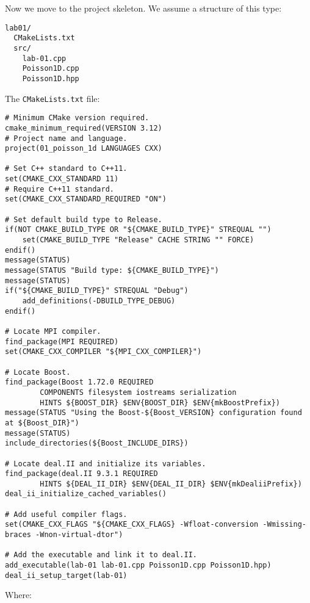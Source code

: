 \noindent
Now we move to the project skeleton. We assume a structure of this type:
\begin{lstlisting}
lab01/
  CMakeLists.txt
  src/
    lab-01.cpp
    Poisson1D.cpp
    Poisson1D.hpp\end{lstlisting}
The \texttt{CMakeLists.txt} file:
\begin{lstlisting}[mathescape=false]
# Minimum CMake version required.
cmake_minimum_required(VERSION 3.12)
# Project name and language.
project(01_poisson_1d LANGUAGES CXX)

# Set C++ standard to C++11.
set(CMAKE_CXX_STANDARD 11)
# Require C++11 standard.
set(CMAKE_CXX_STANDARD_REQUIRED "ON")

# Set default build type to Release.
if(NOT CMAKE_BUILD_TYPE OR "${CMAKE_BUILD_TYPE}" STREQUAL "")
    set(CMAKE_BUILD_TYPE "Release" CACHE STRING "" FORCE)
endif()
message(STATUS)
message(STATUS "Build type: ${CMAKE_BUILD_TYPE}")
message(STATUS)
if("${CMAKE_BUILD_TYPE}" STREQUAL "Debug")
    add_definitions(-DBUILD_TYPE_DEBUG)
endif()

# Locate MPI compiler.
find_package(MPI REQUIRED)
set(CMAKE_CXX_COMPILER "${MPI_CXX_COMPILER}")

# Locate Boost.
find_package(Boost 1.72.0 REQUIRED
        COMPONENTS filesystem iostreams serialization
        HINTS ${BOOST_DIR} $ENV{BOOST_DIR} $ENV{mkBoostPrefix})
message(STATUS "Using the Boost-${Boost_VERSION} configuration found at ${Boost_DIR}")
message(STATUS)
include_directories(${Boost_INCLUDE_DIRS})

# Locate deal.II and initialize its variables.
find_package(deal.II 9.3.1 REQUIRED
        HINTS ${DEAL_II_DIR} $ENV{DEAL_II_DIR} $ENV{mkDealiiPrefix})
deal_ii_initialize_cached_variables()

# Add useful compiler flags.
set(CMAKE_CXX_FLAGS "${CMAKE_CXX_FLAGS} -Wfloat-conversion -Wmissing-braces -Wnon-virtual-dtor")

# Add the executable and link it to deal.II.
add_executable(lab-01 lab-01.cpp Poisson1D.cpp Poisson1D.hpp)
deal_ii_setup_target(lab-01)
\end{lstlisting}
Where:
